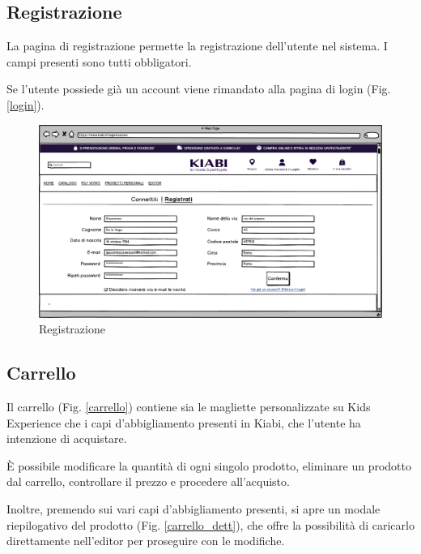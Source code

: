 \documentclass[12pt,italian,]{report}
\begin{document}
\subsection{Registrazione} 

La pagina di registrazione permette la registrazione dell'utente nel sistema. I campi presenti sono tutti obbligatori.

Se l'utente possiede già un account viene rimandato alla pagina di login (Fig. \ref{login}).

\begin{figure}[h]
\centering
\includegraphics{../../balsamiq/balsamiq_finale/Registrazione.png}
\caption{Registrazione}
\label{registrazione}
\end{figure}
\clearpage 





\newpage
\subsection{Carrello} 

Il carrello (Fig. \ref{carrello}) contiene sia le magliette personalizzate su Kids Experience che i capi d'abbigliamento presenti in Kiabi, che l'utente ha intenzione di acquistare. 

È possibile modificare la quantità di ogni singolo prodotto, eliminare un prodotto dal carrello, controllare il prezzo e procedere all'acquisto.

Inoltre, premendo sui vari capi d'abbigliamento presenti, si apre un modale riepilogativo del prodotto (Fig. \ref{carrello_dett}), che offre la possibilità di caricarlo direttamente nell'editor per proseguire con le modifiche. 
\end{document}
